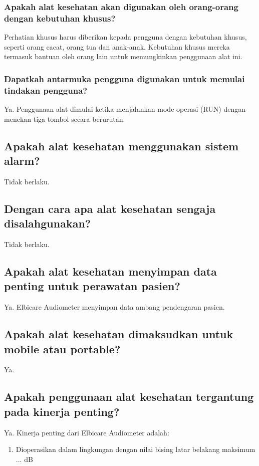 \documentclass[11pt,a4paper,twoside,draft,onecolumn]{book}
\begin{document}
				\subsubsection{Apakah alat kesehatan akan digunakan oleh orang-orang dengan kebutuhan khusus?}
				Perhatian khusus harus diberikan kepada pengguna dengan kebutuhan khusus, seperti orang cacat, orang tua dan anak-anak. Kebutuhan khusus mereka termasuk bantuan oleh orang lain untuk memungkinkan penggunaan alat ini.
				
				\subsubsection{Dapatkah antarmuka pengguna digunakan untuk memulai tindakan pengguna?}
				Ya. Penggunaan alat dimulai ketika menjalankan mode operasi (RUN) dengan menekan tiga tombol secara berurutan.
			
			\subsection{Apakah alat kesehatan menggunakan sistem alarm?}
			Tidak berlaku.
			
			\subsection{Dengan cara apa alat kesehatan sengaja disalahgunakan?}
			Tidak berlaku.
			
			\subsection{Apakah alat kesehatan menyimpan data penting untuk perawatan pasien?}
			Ya. Elbicare Audiometer menyimpan data ambang pendengaran pasien.
			
			\subsection{Apakah alat kesehatan dimaksudkan untuk mobile atau portable?}
			Ya. 
			
			\subsection{Apakah penggunaan alat kesehatan tergantung pada kinerja penting?}
			Ya. Kinerja penting dari Elbicare Audiometer adalah:
			\begin{enumerate}
				\item Dioperasikan dalam lingkungan dengan nilai bising latar belakang maksimum ... dB
			\end{enumerate}
		
\end{document}
